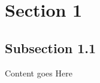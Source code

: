 \graphicspath{{Images/}}

\section{Section 1}
    \subsection{Subsection 1.1}

    Content goes Here